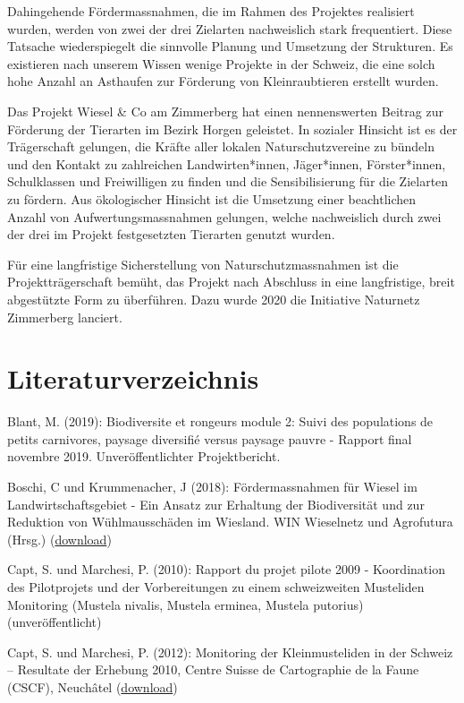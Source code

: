 \documentclass[
  oneside]{scrbook}
\begin{document}
Dahingehende Fördermassnahmen, die im Rahmen des Projektes realisiert wurden, werden von zwei der drei Zielarten nachweislich stark frequentiert. Diese Tatsache wiederspiegelt die sinnvolle Planung und Umsetzung der Strukturen. Es existieren nach unserem Wissen wenige Projekte in der Schweiz, die eine solch hohe Anzahl an Asthaufen zur Förderung von Kleinraubtieren erstellt wurden.

Das Projekt Wiesel \& Co am Zimmerberg hat einen nennenswerten Beitrag zur Förderung der Tierarten im Bezirk Horgen geleistet. In sozialer Hinsicht ist es der Trägerschaft gelungen, die Kräfte aller lokalen Naturschutzvereine zu bündeln und den Kontakt zu zahlreichen Landwirten*innen, Jäger*innen, Förster*innen, Schulklassen und Freiwilligen zu finden und die Sensibilisierung für die Zielarten zu fördern. Aus ökologischer Hinsicht ist die Umsetzung einer beachtlichen Anzahl von Aufwertungsmassnahmen gelungen, welche nachweislich durch zwei der drei im Projekt festgesetzten Tierarten genutzt wurden.

Für eine langfristige Sicherstellung von Naturschutzmassnahmen ist die Projektträgerschaft bemüht, das Projekt nach Abschluss in eine langfristige, breit abgestützte Form zu überführen. Dazu wurde 2020 die Initiative Naturnetz Zimmerberg lanciert.

\hypertarget{literaturverzeichnis}{%
\chapter{Literaturverzeichnis}\label{literaturverzeichnis}}

Blant, M. (2019): Biodiversite et rongeurs module 2: Suivi des populations de petits carnivores, paysage diversifié versus paysage pauvre - Rapport final novembre 2019. Unveröffentlichter Projektbericht.

Boschi, C und Krummenacher, J (2018): Fördermassnahmen für Wiesel im Landwirtschaftsgebiet - Ein Ansatz zur Erhaltung der Biodiversität und zur Reduktion von Wühlmausschäden im Wiesland. WIN Wieselnetz und Agrofutura (Hrsg.) (\href{http://wieselnetz.ch/wp-content/uploads/2018/02/Heft_Wieselfoerdermassnahmen_D_Ed2_CMYK.pdf}{download})

Capt, S. und Marchesi, P. (2010): Rapport du projet pilote 2009 - Koordination des Pilotprojets und der Vorbereitungen zu einem schweizweiten Musteliden Monitoring (Mustela nivalis, Mustela erminea, Mustela putorius) (unveröffentlicht)

Capt, S. und Marchesi, P. (2012): Monitoring der Kleinmusteliden in der Schweiz -- Resultate der Erhebung 2010, Centre Suisse de Cartographie de la Faune (CSCF), Neuchâtel (\href{http://wieselnetz.ch/wp-content/uploads/2016/03/CSCF_Bericht_Monitoring_2010.pdf}{download})
\end{document}
